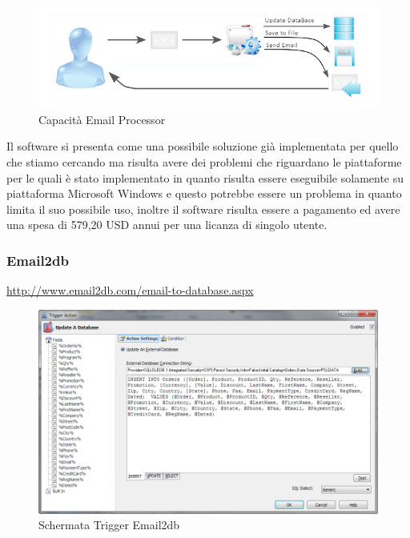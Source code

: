 \begin{figure}
\centering 
\includegraphics[scale=2.5]{img/emailprocessor.png} 
\caption{Capacità Email Processor}
\end{figure}




Il software si presenta come una possibile soluzione già implementata per quello che stiamo cercando ma risulta avere dei problemi che riguardano le piattaforme per le quali è stato implementato in quanto risulta essere eseguibile solamente su piattaforma Microsoft Windows e questo potrebbe essere un problema in quanto limita il suo possibile uso, inoltre il software risulta essere a pagamento ed avere una spesa di  579,20 USD annui per una licanza di singolo utente.
\newpage

\subsubsection{Email2db}
\url{http://www.email2db.com/email-to-database.aspx}\\
\linebreak


\begin{figure}
\centering 
\includegraphics[scale=0.6]{img/email2db.png} 
\caption{Schermata Trigger Email2db}
\end{figure}

